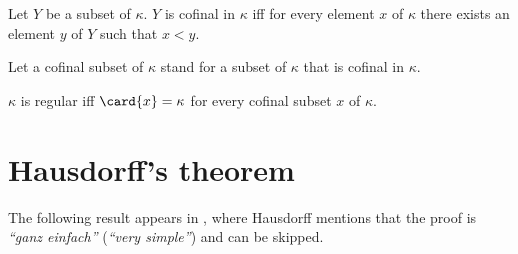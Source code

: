 \documentclass{stex}
\begin{document}
  \begin{forthel}
    \begin{definition*}[Cofinality]
      Let $Y$ be a subset of $\kappa$.
      $Y$ is cofinal in $\kappa$ iff for every element $x$ of $\kappa$ there
      exists an element $y$ of $Y$ such that $x \less y$.
    \end{definition*}

    Let a cofinal subset of $\kappa$ stand for a subset of $\kappa$ that is
    cofinal in $\kappa$.

    \begin{definition*}
      $\kappa$ is regular iff $\card{x} = \kappa$ for every cofinal subset $x$ of
      $\kappa$.
    \end{definition*}
  \end{forthel}


  \section{Hausdorff's theorem}

  The following result appears in \cite[p.~443]{Hausdorff1908},
  where Hausdorff mentions that the proof is
  \textit{``ganz einfach''} (\textit{``very simple''}) and can be skipped.
\end{document}
